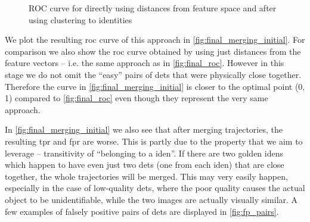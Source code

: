 \begin{figure}
    \centering
    \def\svgwidth{\columnwidth}
    {}
    \caption{ROC curve for directly using distances from feature space and after using clustering to identities}
    \label{fig:final_merging_initial}
\end{figure}

We plot the resulting \gls{roc} curve of this approach in \autoref{fig:final_merging_initial}. For comparison we also show the \gls{roc} curve obtained by using just distances from the feature vectors -- i.e. the same approach as in  \autoref{fig:final_roc}. However in this stage we do not omit the ``easy'' pairs of \glspl{det} that were physically close together. Therefore the curve in \autoref{fig:final_merging_initial} is closer to the optimal point (0, 1) compared to \autoref{fig:final_roc} even though they represent the very same approach.

In \autoref{fig:final_merging_initial} we also see that after merging trajectories, the resulting \gls{tpr} and \gls{fpr} are worse. This is partly due to the property that we aim to leverage -- transitivity of ``belonging to a \gls{iden}''. If there are two golden \glspl{iden} which happen to have even just two \glspl{det} (one from each \gls{iden}) that are close together, the whole trajectories will be merged. This may very easily happen, especially in the case of low-quality \glspl{det}, where the poor quality causes the actual object to be unidentifiable, while the two images are actually visually similar. A few examples of falsely positive pairs of \glspl{det} are displayed in \autoref{fig:fp_pairs}.

